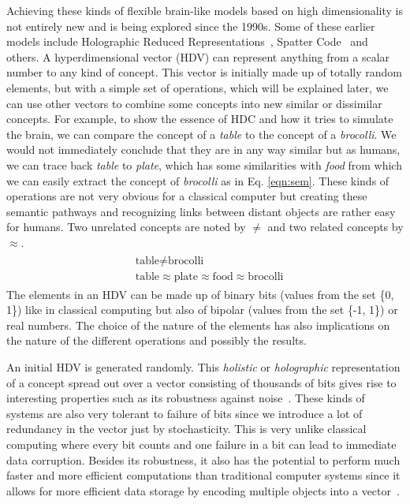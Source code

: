 Achieving these kinds of flexible brain-like models based on high dimensionality is not entirely new and is being explored since the 1990s. Some of these earlier models include Holographic Reduced Representations~\cite{HRR}, Spatter Code~\cite{spatter} and others. A hyperdimensional vector (HDV) can represent anything from a scalar number to any kind of concept. This vector is initially made up of totally random elements, but with a simple set of operations, which will be explained later, we can use other vectors to combine some concepts into new similar or dissimilar concepts. For example, to show the essence of HDC and how it tries to simulate the brain, we can compare the concept of a \textit{table} to the concept of a \textit{brocolli}. We would not immediately conclude that they are in any way similar but as humans, we can trace back \textit{table} to \textit{plate}, which has some similarities with \textit{food} from which we can easily extract the concept of \textit{brocolli} as in Eq. \ref{eqn:sem}. These kinds of operations are not very obvious for a classical computer but creating these semantic pathways and recognizing links between distant objects are rather easy for humans. Two unrelated concepts are noted by $\neq$ and two related concepts by $\approx$.
\begin{align}\label{eqn:sem}
    \begin{split}
    &\textrm{table} \neq \textrm{brocolli} \\        
    &\textrm{table} \approx \textrm{plate} \approx \textrm{food} \approx \textrm{brocolli}
    \end{split}
\end{align}
The elements in an HDV can be made up of binary bits (values from the set \{0, 1\}) like in classical computing but also of bipolar (values from the set \{-1, 1\}) or real numbers. The choice of the nature of the elements has also implications on the nature of the different operations and possibly the results.

An initial HDV is generated randomly. This \textit{holistic} or \textit{holographic} representation of a concept spread out over a vector consisting of thousands of bits gives rise to interesting properties such as its robustness against noise~\cite{hdctheo}. These kinds of systems are also very tolerant to failure of bits since we introduce a lot of redundancy in the vector just by stochasticity. This is very unlike classical computing where every bit counts and one failure in a bit can lead to immediate data corruption. Besides its robustness, it also has the potential to perform much faster and more efficient computations than traditional computer systems since it allows for more efficient data storage by encoding multiple objects into a vector~\cite{Kanerva2009}\cite{hdctheo}.
